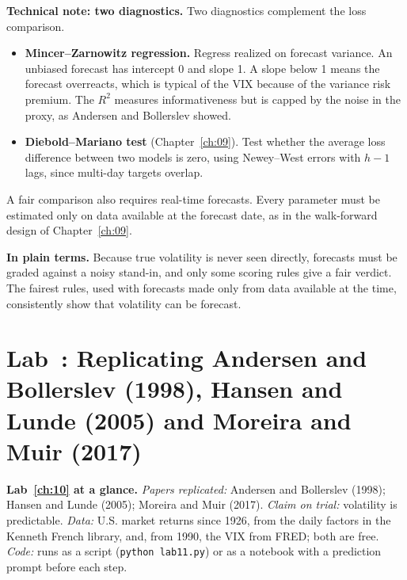 \begin{technote}
\textbf{Technical note: two diagnostics.} Two diagnostics complement the loss comparison.

\begin{itemize}
  \item \textbf{Mincer--Zarnowitz regression.} Regress realized on forecast variance. An unbiased forecast has intercept 0 and slope 1. A slope below 1 means the forecast overreacts, which is typical of the VIX because of the variance risk premium. The $R^2$ measures informativeness but is capped by the noise in the proxy, as Andersen and Bollerslev showed.
  \item \textbf{Diebold--Mariano test} (Chapter~\ref{ch:09}). Test whether the average loss difference between two models is zero, using Newey--West errors with $h - 1$ lags, since multi-day targets overlap.
\end{itemize}
\end{technote}

A fair comparison also requires real-time forecasts. Every parameter must be estimated only on data available at the forecast date, as in the walk-forward design of Chapter~\ref{ch:09}.

\noindent\textbf{In plain terms.} Because true volatility is never seen directly, forecasts must be graded against a noisy stand-in, and only some scoring rules give a fair verdict. The fairest rules, used with forecasts made only from data available at the time, consistently show that volatility can be forecast.

\section{Lab~\thechapter: Replicating Andersen and Bollerslev (1998), Hansen and Lunde (2005) and Moreira and Muir (2017)}
\label{sec:10-lab}

\begin{callout}
\textbf{Lab~\ref{ch:10} at a glance.} \emph{Papers replicated:} Andersen and Bollerslev (1998); Hansen and Lunde (2005); Moreira and Muir (2017). \emph{Claim on trial:} volatility is predictable. \emph{Data:} U.S. market returns since 1926, from the daily factors in the Kenneth French library, and, from 1990, the VIX from FRED; both are free. \emph{Code:} runs as a script (\texttt{python lab11.py}) or as a notebook with a prediction prompt before each step.
\end{callout}

